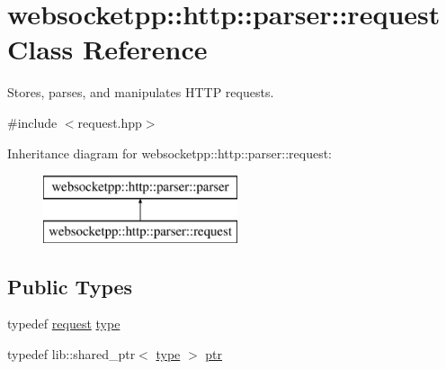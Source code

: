 \hypertarget{classwebsocketpp_1_1http_1_1parser_1_1request}{}\section{websocketpp\+:\+:http\+:\+:parser\+:\+:request Class Reference}
\label{classwebsocketpp_1_1http_1_1parser_1_1request}


Stores, parses, and manipulates H\+T\+T\+P requests.  




{\ttfamily \#include $<$request.\+hpp$>$}

Inheritance diagram for websocketpp\+:\+:http\+:\+:parser\+:\+:request\+:\begin{figure}[H]
\begin{center}
\leavevmode
\includegraphics[height=2.000000cm]{classwebsocketpp_1_1http_1_1parser_1_1request}
\end{center}
\end{figure}
\subsection*{Public Types}
\begin{DoxyCompactItemize}
\item 
typedef \hyperlink{classwebsocketpp_1_1http_1_1parser_1_1request}{request} \hyperlink{classwebsocketpp_1_1http_1_1parser_1_1request_a456cf14e4c5fd1dab94910580042de6b}{type}
\item 
typedef lib\+::shared\+\_\+ptr$<$ \hyperlink{classwebsocketpp_1_1http_1_1parser_1_1request_a456cf14e4c5fd1dab94910580042de6b}{type} $>$ \hyperlink{classwebsocketpp_1_1http_1_1parser_1_1request_aa9284144353524d93cedf6c053ac07cf}{ptr}
\end{DoxyCompactItemize}
